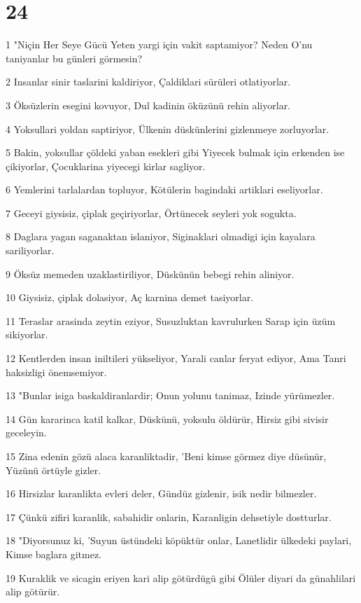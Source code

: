 \chapter{24}

\par 1 "Niçin Her Seye Gücü Yeten yargi için vakit saptamiyor? Neden O'nu taniyanlar bu günleri görmesin?
\par 2 Insanlar sinir taslarini kaldiriyor, Çaldiklari sürüleri otlatiyorlar.
\par 3 Öksüzlerin esegini kovuyor, Dul kadinin öküzünü rehin aliyorlar.
\par 4 Yoksullari yoldan saptiriyor, Ülkenin düskünlerini gizlenmeye zorluyorlar.
\par 5 Bakin, yoksullar çöldeki yaban esekleri gibi Yiyecek bulmak için erkenden ise çikiyorlar, Çocuklarina yiyecegi kirlar sagliyor.
\par 6 Yemlerini tarlalardan topluyor, Kötülerin bagindaki artiklari eseliyorlar.
\par 7 Geceyi giysisiz, çiplak geçiriyorlar, Örtünecek seyleri yok sogukta.
\par 8 Daglara yagan saganaktan islaniyor, Siginaklari olmadigi için kayalara sariliyorlar.
\par 9 Öksüz memeden uzaklastiriliyor, Düskünün bebegi rehin aliniyor.
\par 10 Giysisiz, çiplak dolasiyor, Aç karnina demet tasiyorlar.
\par 11 Teraslar arasinda zeytin eziyor, Susuzluktan kavrulurken Sarap için üzüm sikiyorlar.
\par 12 Kentlerden insan iniltileri yükseliyor, Yarali canlar feryat ediyor, Ama Tanri haksizligi önemsemiyor.
\par 13 "Bunlar isiga baskaldiranlardir; Onun yolunu tanimaz, Izinde yürümezler.
\par 14 Gün kararinca katil kalkar, Düskünü, yoksulu öldürür, Hirsiz gibi sivisir geceleyin.
\par 15 Zina edenin gözü alaca karanliktadir, 'Beni kimse görmez diye düsünür, Yüzünü örtüyle gizler.
\par 16 Hirsizlar karanlikta evleri deler, Gündüz gizlenir, isik nedir bilmezler.
\par 17 Çünkü zifiri karanlik, sabahidir onlarin, Karanligin dehsetiyle dostturlar.
\par 18 "Diyorsunuz ki, 'Suyun üstündeki köpüktür onlar, Lanetlidir ülkedeki paylari, Kimse baglara gitmez.
\par 19 Kuraklik ve sicagin eriyen kari alip götürdügü gibi Ölüler diyari da günahlilari alip götürür.
